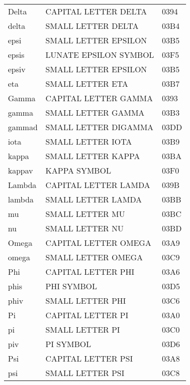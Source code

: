 \begin{latin}
\begin{longtable}{@{}lll}
Delta              &  CAPITAL LETTER DELTA          & 0394\\
delta              &  SMALL LETTER DELTA            & 03B4\\
epsi               &  SMALL LETTER EPSILON          & 03B5\\
epsis              &  LUNATE EPSILON SYMBOL         & 03F5\\
epsiv              &  SMALL LETTER EPSILON          & 03B5\\
eta                &  SMALL LETTER ETA              & 03B7\\
Gamma              &  CAPITAL LETTER GAMMA          & 0393\\
gamma              &  SMALL LETTER GAMMA            & 03B3\\
gammad             &  SMALL LETTER DIGAMMA          & 03DD\\
iota               &  SMALL LETTER IOTA             & 03B9\\
kappa              &  SMALL LETTER KAPPA            & 03BA\\
kappav             &  KAPPA SYMBOL                  & 03F0\\
Lambda             &  CAPITAL LETTER LAMDA          & 039B\\
lambda             &  SMALL LETTER LAMDA            & 03BB\\
mu                 &  SMALL LETTER MU               & 03BC\\
nu                 &  SMALL LETTER NU               & 03BD\\
Omega              &  CAPITAL LETTER OMEGA          & 03A9\\
omega              &  SMALL LETTER OMEGA            & 03C9\\
Phi                &  CAPITAL LETTER PHI            & 03A6\\
phis               &  PHI SYMBOL                    & 03D5\\
phiv               &  SMALL LETTER PHI              & 03C6\\
Pi                 &  CAPITAL LETTER PI             & 03A0\\
pi                 &  SMALL LETTER PI               & 03C0\\
piv                &  PI SYMBOL                     & 03D6\\
Psi                &  CAPITAL LETTER PSI            & 03A8\\
psi                &  SMALL LETTER PSI              & 03C8\\

\end{longtable}
\end{latin}
